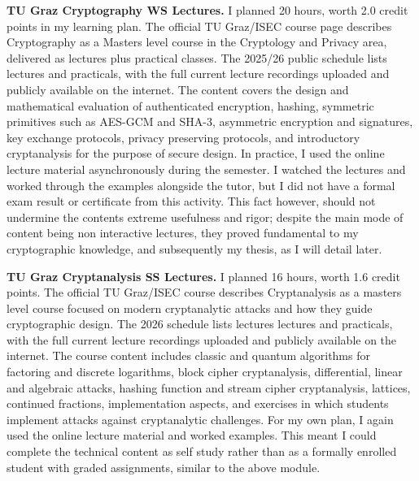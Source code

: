 \documentclass[11pt]{article}
\begin{document}
\textbf{TU Graz Cryptography WS Lectures.} I planned 20 hours, worth 2.0 credit points in my learning plan. The official TU Graz/ISEC course page describes Cryptography as a Masters level course in the Cryptology and Privacy area, delivered as lectures plus practical classes. The 2025/26 public schedule lists lectures and practicals, with the full current lecture recordings uploaded and publicly available on the internet. The content covers the design and mathematical evaluation of authenticated encryption, hashing, symmetric primitives such as AES-GCM and SHA-3, asymmetric encryption and signatures, key exchange protocols, privacy preserving protocols, and introductory cryptanalysis for the purpose of secure design. In practice, I used the online lecture material asynchronously during the semester. I watched the lectures and worked through the examples alongside the tutor, but I did not have a formal exam result or certificate from this activity. This fact however, should not undermine the contents extreme usefulness and rigor; despite the main mode of content being non interactive lectures, they proved fundamental to my cryptographic knowledge, and subsequently my thesis, as I will detail later.

\textbf{TU Graz Cryptanalysis SS Lectures.} I planned 16 hours, worth 1.6 credit points. The official TU Graz/ISEC course describes Cryptanalysis as a masters level course focused on modern cryptanalytic attacks and how they guide cryptographic design. The 2026 schedule lists lectures lectures and practicals, with the full current lecture recordings uploaded and publicly available on the internet. The course content includes classic and quantum algorithms for factoring and discrete logarithms, block cipher cryptanalysis, differential, linear and algebraic attacks, hashing function and stream cipher cryptanalysis, lattices, continued fractions, implementation aspects, and exercises in which students implement attacks against cryptanalytic challenges. For my own plan, I again used the online lecture material and worked examples. This meant I could complete the technical content as self study rather than as a formally enrolled student with graded assignments, similar to the above module.
\end{document}
